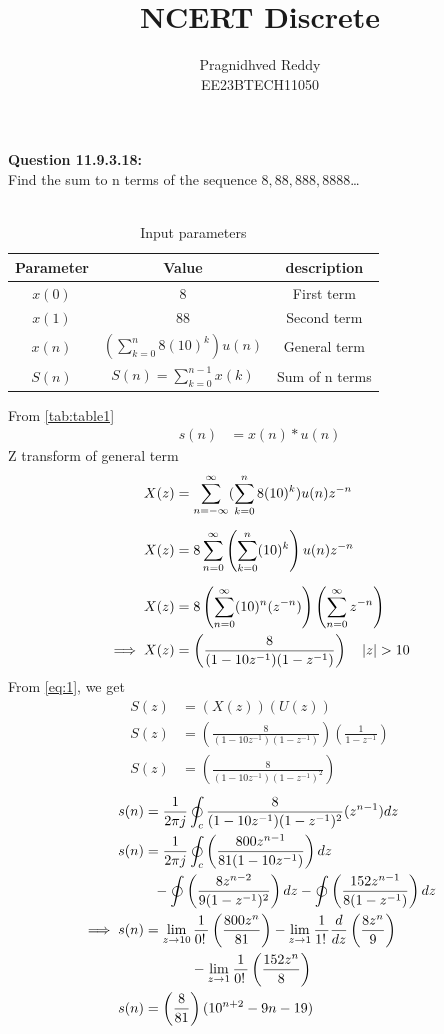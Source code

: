 \documentclass[journal,12pt,twocolumn]{IEEEtran}
\title{NCERT Discrete}
\author{Pragnidhved Reddy\\EE23BTECH11050}
\date{}
\begin{document}
\maketitle
\newpage
\bigskip
\textbf{Question 11.9.3.18:}\\
 Find the sum to n terms of the sequence $8,88,888,8888$\ldots\\
 \solution \\
 \begin{table}[H]
\centering
\setlength{\extrarowheight}{8pt}
\begin{tabular}{|c|c|c|}\hline
\textbf{Parameter} & \textbf{Value} & \textbf{description}\\ \hline
$x(0)$ & 8 & First term \\ \hline
$x(1)$ & 88 & Second term \\ \hline 
$x(n)$ & $(\sum^{n}_{k=0}8(10)^k)u(n)$ & General term \\ \hline
$S(n)$ & $S(n)=\sum^{n-1}_{k=0}x(k)$ & Sum of n terms \\ \hline
\end{tabular}
\caption{Input parameters}
\label{tab:table1}
\end{table}
 From \eqref{tab:table1}
\begin{align}
\label{eq:eq1}
 s(n)&=x(n)* u(n)
 \end{align}
 Z transform of general term
 \begin{align}
 X(z)&=\sum_{n=-\infty}^{\infty}(\sum_{k=0}^{n}8(10)^k)u(n)z^{-n}\\[6pt]
 X(z)&=8\sum_{n=0}^{\infty}\left(\sum_{k=0}^{n}(10)^k\right)u(n)z^{-n}\\[6pt]
 X(z)&=8\left(\sum_{n=0}^{\infty}(10)^n(z^{-n})\right)\left(\sum_{n=0}^{\infty}z^{-n}\right)\\
 \implies X(z)&=\left(\frac{8}{(1-10z^{-1})(1-z^{-1})}\right) \quad \left\vert z\right\vert>10
\end{align}
From \eqref{eq:1}, we get
 \begin{align}
 S(z)&=(X(z))(U(z))\\
 S(z)&=\left(\frac{8}{(1-10z^{-1})(1-z^{-1})}\right)\left(\frac{1}{1-z^{-1}}\right)\\[6pt]
 S(z)&=\left(\frac{8}{(1-10z^{-1})(1-z^{-1})^2}\right)
\end{align}
\begin{align}
 s(n)&=\frac{1}{2\pi j}\oint_{c}\frac{8}{(1-10z^{-1})(1-z^{-1})^2}(z^{n-1})dz\\
\notag s(n)&=\frac{1}{2\pi j} \oint_{c} \left(\frac{800z^{n-1}}{81(1-10z^{-1})}\right)dz\\ &~~-
\oint \left(\frac{8z^{n-2}}{9(1-z^{-1})^2}\right)dz-\oint \left(\frac{152z^{n-1}}{8(1-z^{-1})} \right)dz\\
\notag \implies s(n)&=\lim_{z\to10}\frac{1}{0\displaystyle !\,}\left(\frac{800z^n}{81}\right)-\lim_{z\to1}\frac{1}{1\displaystyle !\,}\frac{d}{dz}\left(\frac{8z^n}{9}\right)\\ &~~~~~~~~~~-\lim_{z\to1}\frac{1}{0\displaystyle !\,}\left(\frac{152z^n}{8}\right)\\
 s(n)&=\left(\frac{8}{81}\right)(10^{n+2}-9n-19)   
\end{align}
\end{document}
